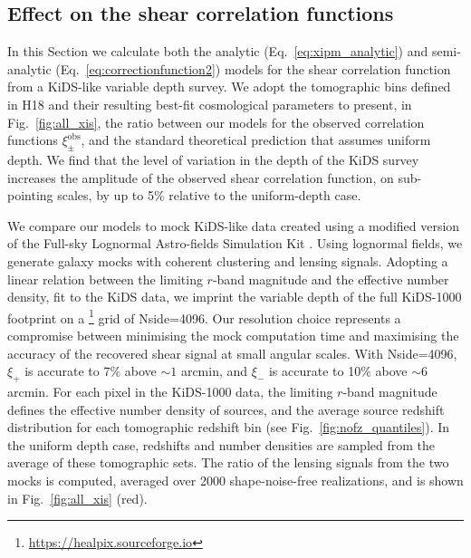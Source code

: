 \documentclass{aa}
\renewcommand{\rm}{\mathrm}
\begin{document}
\subsection{Effect on the shear correlation functions}

In this Section we calculate both the analytic (Eq.~\ref{eq:xipm_analytic}) and semi-analytic (Eq.~\ref{eq:correctionfunction2}) models for the shear correlation function from a KiDS-like variable depth survey.   We adopt the tomographic bins defined in H18 and their resulting best-fit cosmological parameters to present, in Fig.~\ref{fig:all_xis}, the ratio between our models for the observed correlation functions $\xi_\pm^{\rm{obs}}$, and the standard theoretical prediction that assumes uniform depth. We find that the level of variation in the depth of the KiDS survey increases the amplitude of the observed shear correlation function, on sub-pointing scales, by up to 5\% relative to the uniform-depth case.

We compare our models to mock KiDS-like data created using a modified version of the Full-sky Lognormal Astro-fields Simulation Kit \citep[\textsc{FLASK},][Joachimi, Lin, et al. in prep.]{Xavier:2016}.  Using {} lognormal fields, we generate galaxy mocks with coherent clustering and lensing signals.   Adopting a linear relation between the limiting $r$-band magnitude and the effective number density, fit to the KiDS data, we imprint the variable depth of the full KiDS-1000 footprint \citep{Kuijken:2019} on a {}\footnote{\url{https://healpix.sourceforge.io}} grid of Nside=4096.  Our resolution choice represents a compromise between minimising the mock computation time and maximising the accuracy of the recovered shear signal at small angular scales. With Nside=4096, $\xi_+$ is accurate to 7\% above $\sim 1$ arcmin, and $\xi_-$ is accurate to 10\% above $\sim6$ arcmin.   For each {} pixel in the KiDS-1000 data, the limiting $r$-band magnitude defines the effective number density of sources, and the average source redshift distribution for each tomographic redshift bin (see Fig.~\ref{fig:nofz_quantiles}).  In the uniform depth case, redshifts and number densities are sampled from the average of these tomographic sets.  The ratio of the lensing signals from the two mocks is computed, averaged over 2000 shape-noise-free realizations, and is shown in Fig.~\ref{fig:all_xis} (red).
\end{document}
